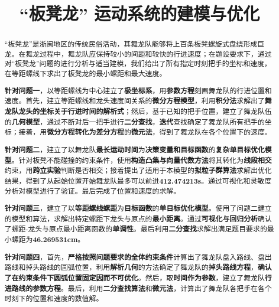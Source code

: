 \documentclass[a4paper]{article}
\title{“板凳龙” 运动系统的建模与优化}
\date{} %
\begin{document}
	\maketitle
	\vspace{-6em} %
	\begin{abstract}
		“板凳龙”是浙闽地区的传统民俗活动，其舞龙队能够将上百条板凳螺旋式盘绕形成巨龙。在舞龙过程中，舞龙队应保持较小的间距和较快的行进速度；在题设要求下，通过对“板凳龙”问题的进行分析与适当建模，我们给出了所有指定时刻把手的坐标和速度，在等距螺线下求出了板凳龙的最小螺距和最大速度。

		\hspace{0.2em}\textbf{针对问题一}，以等距螺线为中心建立了\textbf{极坐标系}，用\textbf{参数方程}刻画舞龙队的行进位置和速度。首先，建立等距螺线和龙头速度间关系的\textbf{微分方程模型}，利用\textbf{积分法}求解出了\textbf{舞龙队龙头的坐标关于行进时间的解析式}；然后，基于已知的把手位置，建立了舞龙队伍的\textbf{几何模型}，通过不断对后一把手进行\textbf{二分查找}，\textbf{迭代}查找确定了舞龙队所有把手的坐标；接着，用\textbf{微分方程转化为差分方程}的\textbf{微元法}，得到了舞龙队在各个位置下的速度。

		\textbf{针对问题二}，建立了以舞龙队\textbf{最长运动时间}为\textbf{决策变量和目标函数}的\textbf{复杂单目标优化模型}。针对板凳不能碰撞的约束条件，使用\textbf{构造凸集与向量代数方法}将其转化为\textbf{线段相交}约束，用\textbf{跨立实验}判断是否相交；接着提出了适用于本模型的\textbf{拟粒子群算法}求解出优化结果，得到了从起始位置开始舞龙队最多可以前进\textbf{412.474213s}。通过可视化和灵敏度分析对模型进行了验证。最后完成了位置和速度的求解。

		\textbf{针对问题三}，建立了以\textbf{等距螺线螺距}为\textbf{目标函数}的\textbf{单目标优化模型}。使用了问题二建立的模型和算法，求解出特定螺距下龙头与原点的\textbf{最小距离}。通过\textbf{可视化与回归分析}确认了螺距-龙头与原点最小距离函数的\textbf{单调性}。最后利用\textbf{二分查找}求解出满足题目要求的最小螺距为\textbf{46.269531cm}。

		\textbf{针对问题四}，首先，\textbf{严格按照问题要求的全体约束条件}计算出了舞龙队盘入路线、盘出路线和掉头路线的圆弧位置，利用\textbf{解析几何}的方法确定了舞龙队的\textbf{掉头路线方程}，\textbf{确认了在约束条件下圆弧位置固定因而不可优化}。然后，取\textbf{时间作为参数}，建立了舞龙队\textbf{行进路线的参数方程}。最后，利用\textbf{二分查找算法}和\textbf{微元法}，计算出了舞龙队各把手在各个时刻下的位置和速度的数值解。


\end{abstract}
\end{document}
